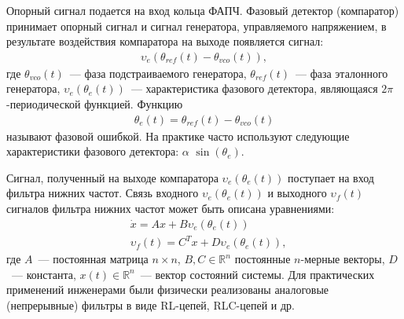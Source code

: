 \documentclass[a4paper,article,14pt]{extarticle}
\begin{document}
Опорный сигнал подается на вход кольца ФАПЧ. Фазовый детектор (компаратор) принимает опорный сигнал и сигнал генератора, управляемого напряжением, в результате воздействия компаратора на выходе появляется сигнал:
 \begin{equation*}
 \begin{aligned}
\upsilon_e(\theta_{ref}(t) - \theta_{vco}(t)),
 \end{aligned}
\end{equation*}
где $\theta_{vco}(t)$~--- фаза подстраиваемого генератора, $\theta_{ref}(t)$~--- фаза эталонного генератора, $\upsilon_e(\theta_e(t))$~--- характеристика фазового детектора, являющаяся $2\pi$-периодической функцией. Функцию
 \begin{equation}\label{phase_error}
 \begin{aligned}
\theta_e(t) = \theta_{ref}(t) - \theta_{vco}(t)
 \end{aligned}
\end{equation}
называют фазовой ошибкой. На практике часто используют следующие характеристики фазового детектора: $\alpha$ $\operatorname{sin}(\theta_e)$.

Сигнал, полученный на выходе компаратора $\upsilon_e(\theta_e(t))$ поступает на вход фильтра нижних частот. Связь входного $\upsilon_e(\theta_e(t))$ и выходного $\upsilon_f(t)$ сигналов фильтра нижних частот может быть описана уравнениями:
 \begin{equation}\label{linear_block_eq}
 \begin{aligned}
&\dot{x} = Ax + B\upsilon_e(\theta_e(t))\\
&\upsilon_f(t) = C^Tx + D\upsilon_e(\theta_e(t)),
 \end{aligned}
\end{equation}
где $A$~--- постоянная матрица $n \times n$, $B, C \in \mathbb{R}^n$  постоянные $n$-мерные векторы, $D$~--- константа, $x(t) \in \mathbb{R}^n$~--- вектор состояний системы. Для практических применений инженерами были физически реализованы аналоговые (непрерывные) фильтры в виде RL-цепей, RLC-цепей и др.
\end{document}
